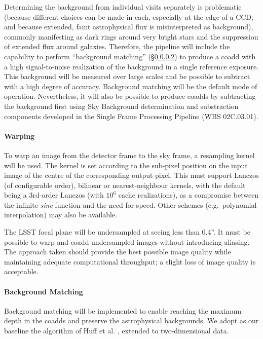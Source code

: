 \documentclass[12pt]{article}
\newcommand{\wbsSFM}{WBS 02C.03.01}
\begin{document}
Determining the background from individual visits separately is problematic (because different choices can be made in each, especially at the edge of a CCD; and because extended, faint astrophysical flux is misinterpreted as background), commonly manifesting as dark rings around very bright stars and the suppression of extended flux around galaxies. Therefore, the pipeline will include the capability to perform ``background matching'' (\S\ref{alg:backgroundMatching}) to produce a coadd with a high signal-to-noise realization of the background in a single reference exposure.  This background will be measured over large scales and be possible to subtract with a high degree of accuracy. Background matching will be the default mode of operation. Nevertheless, it will also be possible to produce coadds by subtracting the background first using Sky Background determination and substraction components developed in the Single Frame Processing Pipeline (\wbsSFM).

\paragraph{Warping}
\label{alg:warp}

To warp an image from the detector frame to the sky frame, a resampling kernel will be used. The kernel is set according to the sub-pixel position on the input image of the centre of the corresponding output pixel. This must support Lanczos (of configurable order), bilinear or nearest-neighbour kernels, with the default being a 3rd-order Lanczos (with $10^6$ cache realizations), as a compromise between the infinite \emph{sinc} function and the need for speed. Other schemes (e.g.\ polynomial interpolation) may also be available.

The LSST focal plane will be undersampled at seeing less than 0.4''. It must be possible to warp and coadd undersampled images without introducing aliasing. The approach taken should provide the best possible image quality while maintaining adequate computational throughput; a slight loss of image quality is acceptable.

\paragraph{Background Matching}
\label{alg:backgroundMatching}

Background matching will be implemented to enable reaching the maximum depth in the coadds and preserve the astrophysical backgrounds.  We adopt as our baseline the algorithm of Huff et al. \cite{Huff11}, extended to two-dimensional data.
\end{document}
